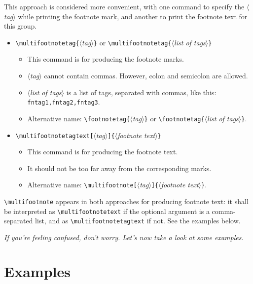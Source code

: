 \documentclass[classical]{einfart}
\newcommand{\meta}[1]{$\langle${\normalfont\itshape#1}$\rangle$}
\newcommand{\commandoption}[1]{\texttt{\textcolor{code-keys}{#1}}}
\newenvironment{tip}[1][Tip]
  {%
    \LocallyStopLineNumbers%
    \begin{tcolorbox}[breakable,
        enhanced,
        width = \textwidth,
        colback = paper, colbacktitle = paper,
        colframe = gray!50, boxrule=0.2mm,
        coltitle = black,
        fonttitle = \sffamily,
        attach boxed title to top left = {yshift=-\tcboxedtitleheight/2, xshift=.5cm},
        boxed title style = {boxrule=0pt, colframe=paper},
        before skip = 3mm,
        after skip = 3mm,
        top = 2.5mm,
        bottom = 1.5mm,
        title={\scshape\sffamily #1}]%
  }
  {%
    \end{tcolorbox}%
    \ResumeLineNumbers%
  }
\begin{document}
This approach is considered more convenient, with one command to specify the \meta{tag} while printing the footnote mark, and another to print the footnote text for this group.
\begin{itemize}
    \item \lstinline|\multifootnotetag{|\meta{tag}\lstinline|}| or \lstinline|\multifootnotetag{|\meta{list of tags}\lstinline|}|
    \begin{itemize}
        \item This command is for producing the footnote marks.
        \item \meta{tag} cannot contain commas. However, colon \textquote{\texttt{:}} and semicolon \textquote{\texttt{;}} are allowed.
        \item \meta{list of tags} is a list of tags, separated with commas, like this: \commandoption{fntag1,fntag2,fntag3}.
        \item Alternative name: \lstinline|\footnotetag{|\meta{tag}\lstinline|}| or \lstinline|\footnotetag{|\meta{list of tags}\lstinline|}|.
    \end{itemize}
    \item \lstinline|\multifootnotetagtext[|\meta{tag}\lstinline|]{|\meta{footnote text}\lstinline|}|
    \begin{itemize}
        \item This command is for producing the footnote text.
        \item It should not be too far away from the corresponding marks.
        \item Alternative name: \lstinline|\multifootnote[|\meta{tag}\lstinline|]{|\meta{footnote text}\lstinline|}|.
    \end{itemize}
\end{itemize}

\begin{tip}
    \lstinline|\multifootnote| appears in both approaches for producing footnote text: it shall be interpreted as \lstinline|\multifootnotetext| if the optional argument is a comma-separated list, and as \lstinline|\multifootnotetagtext| if not. See the examples below.
\end{tip}

\bigskip
\begin{center}
    \itshape
    If you're feeling confused, don't worry. Let's now take a look at some examples.
\end{center}


\section{Examples}
\end{document}
